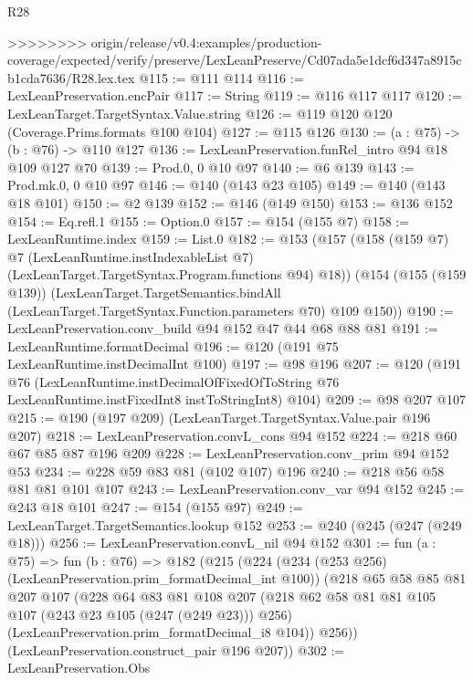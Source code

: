 \begin{lexlean}{R28}
\begin{coremodule}
{{{{{>>>>>>>> origin/release/v0.4:examples/production-coverage/expected/verify/preserve/LexLeanPreserve/Cd07ada5e1dcf6d347a8915cb1cda7636/R28.lex.tex
@115 := @111 @114
@116 := LexLeanPreservation.encPair
@117 := String
@119 := @116 @117 @117
@120 := LexLeanTarget.TargetSyntax.Value.string
@126 := @119 @120 @120 (Coverage.Prims.formats @100 @104)
@127 := @115 @126
@130 := (a : @75) -> (b : @76) -> @110 @127
@136 := LexLeanPreservation.funRel_intro @94 @18 @109 @127 @70
@139 := Prod.{0, 0} @10 @97
@140 := @6 @139
@143 := Prod.mk.{0, 0} @10 @97
@146 := @140 (@143 @23 @105)
@149 := @140 (@143 @18 @101)
@150 := @2 @139
@152 := @146 (@149 @150)
@153 := @136 @152
@154 := Eq.refl.{1}
@155 := Option.{0}
@157 := @154 (@155 @7)
@158 := LexLeanRuntime.index
@159 := List.{0}
@182 := @153
    (@157
      (@158
        (@159 @7)
        @7
        (LexLeanRuntime.instIndexableList @7)
        (LexLeanTarget.TargetSyntax.Program.functions @94)
        @18))
    (@154
      (@155 (@159 @139))
      (LexLeanTarget.TargetSemantics.bindAll
        (LexLeanTarget.TargetSyntax.Function.parameters @70)
        @109
        @150))
@190 := LexLeanPreservation.conv_build @94 @152 @47 @44 @68 @88 @81
@191 := LexLeanRuntime.formatDecimal
@196 := @120 (@191 @75 LexLeanRuntime.instDecimalInt @100)
@197 := @98 @196
@207 := @120
    (@191
      @76
      (LexLeanRuntime.instDecimalOfFixedOfToString
        @76
        LexLeanRuntime.instFixedInt8
        instToStringInt8)
      @104)
@209 := @98 @207 @107
@215 := @190 (@197 @209) (LexLeanTarget.TargetSyntax.Value.pair @196 @207)
@218 := LexLeanPreservation.convL_cons @94 @152
@224 := @218 @60 @67 @85 @87 @196 @209
@228 := LexLeanPreservation.conv_prim @94 @152 @53
@234 := @228 @59 @83 @81 (@102 @107) @196
@240 := @218 @56 @58 @81 @81 @101 @107
@243 := LexLeanPreservation.conv_var @94 @152
@245 := @243 @18 @101
@247 := @154 (@155 @97)
@249 := LexLeanTarget.TargetSemantics.lookup @152
@253 := @240 (@245 (@247 (@249 @18)))
@256 := LexLeanPreservation.convL_nil @94 @152
@301 := fun (a : @75) =>
  fun (b : @76) =>
  @182
    (@215
      (@224
        (@234 (@253 @256) (LexLeanPreservation.prim_formatDecimal_int @100))
        (@218
          @65
          @58
          @85
          @81
          @207
          @107
          (@228
            @64
            @83
            @81
            @108
            @207
            (@218 @62 @58 @81 @81 @105 @107 (@243 @23 @105 (@247 (@249 @23))) @256)
            (LexLeanPreservation.prim_formatDecimal_i8 @104))
          @256))
      (LexLeanPreservation.construct_pair @196 @207))
@302 := LexLeanPreservation.Obs
}}}}}
\end{coremodule}
\end{lexlean}
